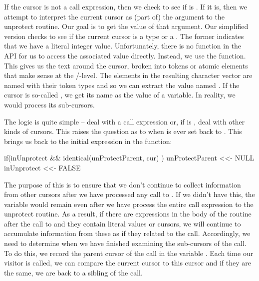 If the cursor is not a call expression, then we check to see if
 is \Rtrue.  If it is, then we attempt to interpret
the current cursor as (part of) the argument to the unprotect routine.
Our goal is to get the value of that argument.  Our simplified version
checks to see if the current cursor is a
 type or a .
The former indicates that we have a literal integer value.
Unfortunately, there is no function in the \libclang{} API for us to
access the associated value directly. Instead, we use the
 function. This gives us the text around the
cursor, broken into tokens or atomic elements that make sense at the
\C/\Cpp-level.  The elements in the resulting character vector are
named with their token types and so we can extract the
value named .  If the cursor is so-called
, we get its name as the value of a
variable. In reality, we would process its sub-cursors.

The logic is quite simple -- deal with a call expression or, if
 is \Rtrue{}, deal with other kinds of cursors.
This raises the question as to when  is ever set
back to \Rfalse.  This brings us back to the initial 
expression in the function:
\begin{RCode}
if(inUnprotect && identical(unProtectParent, cur) ) {
   unProtectParent <<- NULL
   inUnprotect <<- FALSE
}
\end{RCode}
The purpose of this is to ensure that we don't continue to collect
information from other cursors after we have processed any call to
.  If we didn't have this, the variable
 would remain \Rtrue{} even after we have process
the entire call expression to the unprotect routine.  As a result, if
there are \C{} expressions in the body of the routine after the call
to  and they contain literal values or
 cursors, we will continue to accumulate
information from these as if they related to the 
call. Accordingly, we need to determine when we have finished
examining the sub-cursors of the  call.  To do this,
we record the parent cursor of the  call in
the variable . Each time our visitor is called, we can
compare the current cursor to this cursor and if they are the same, we
are back to a sibling of the  call.

